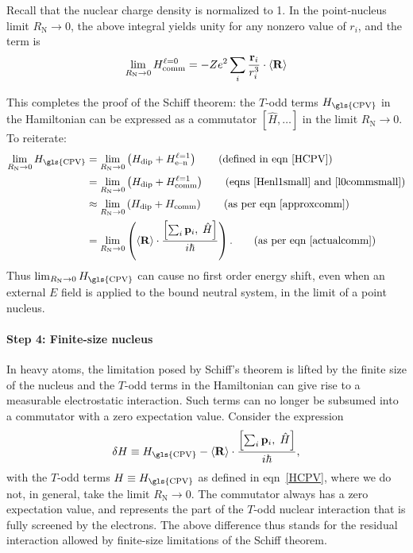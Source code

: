 Recall that the nuclear charge density is normalized to 1. In the point-nucleus
limit $R_\text{N}\to0$, the above integral yields unity for any nonzero value of
$r_i$, and the term is
%
\begin{equation}
    \label{l0commsmall}
    \lim\limits_{R_\text{N}\to0}
    H_\text{comm}^{\ell=0}
    =
    -Ze^2\sum_i\frac{\mathbf{r}_i}{r_i^3}\cdot\langle \mathbf{R}\rangle
\end{equation}

This completes the proof of the Schiff theorem: the $T$-odd terms
$H_\text{\gls{CPV}}$ in the Hamiltonian can be expressed as a commutator $[\hat
H,\ldots]$ in the limit $R_\text{N}\to0$. To reiterate:
%
\begingroup
\allowdisplaybreaks
\begin{align*}
    \lim\limits_{R_\text{N}\to0}
    H_\text{\gls{CPV}}
    &=
    \lim\limits_{R_\text{N}\to0}\left(
        H_\text{dip}+H_\text{e--n}^{\ell=1}
        \right) \tag{defined in eqn~\ref{HCPV}} \\
    &=
    \lim\limits_{R_\text{N}\to0}\left(
        H_\text{dip}+H_\text{comm}^{\ell=1}
        \right) \tag{eqns~\ref{Henl1small} and \ref{l0commsmall}} \\
    &\approx
    \lim\limits_{R_\text{N}\to0}\left(
        H_\text{dip}+H_\text{comm}
        \right) \tag{as per eqn~\ref{approxcomm}} \\
    &=
    \lim\limits_{R_\text{N}\to0}\left(
        \ex{\vec R}\cdot
        \frac{\left[\textstyle\sum_i\vec p_i,\;\hat H\right]}{i\hbar}
        \right). \tag{as per eqn~\ref{actualcomm}}
\end{align*}
\endgroup
%
Thus $\lim_{R_\text{N}\to0}H_\text{\gls{CPV}}$ can cause no first order energy
shift, even when an external $E$ field is applied to the bound neutral system,
in the limit of a point nucleus.

\paragraph{Step 4: Finite-size nucleus}

In heavy atoms, the limitation posed by Schiff's theorem is lifted by the finite
size of the nucleus and the $T$-odd terms in the Hamiltonian can give rise to a
measurable electrostatic interaction. Such terms can no longer be subsumed into
a commutator with a zero expectation value. Consider the expression
%
\begin{equation}
    \label{definedeltaH}
   \delta H\equiv H_\text{\gls{CPV}}-
\ex{\vec R}\cdot
\frac{\left[\textstyle\sum_i\vec p_i,\;\hat H\right]}{i\hbar},
\end{equation}
with the $T$-odd terms $H\equiv H_\text{\gls{CPV}}$ as defined in
eqn~\ref{HCPV}, where we do not, in general, take the limit $R_\text{N}\to0$.
The commutator always has a zero expectation value, and represents the part of
the $T$-odd nuclear interaction that is fully screened by the electrons. The
above difference thus stands for the residual interaction allowed by finite-size
limitations of the Schiff theorem.

